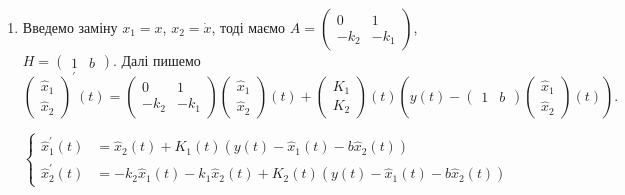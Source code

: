 \begin{solution}
\begin{enumerate}
        \item Введемо заміну $x_1 = x$, $x_2 = \dot x$, тоді маємо $A = \begin{pmatrix} 0 & 1 \\ - k_2 & - k_1 \end{pmatrix}$, $H = \begin{pmatrix} 1 & b \end{pmatrix}$. Далі пишемо
        \[ \begin{pmatrix} \hat x_1 \\ \hat x_2 \end{pmatrix}^\prime (t) = \begin{pmatrix} 0 & 1 \\ - k_2 & - k_1 \end{pmatrix} \begin{pmatrix} \hat x_1 \\ \hat x_2 \end{pmatrix} (t) + \begin{pmatrix} K_1 \\ K_2 \end{pmatrix} (t) \left( y(t) - \begin{pmatrix} 1 & b \end{pmatrix} \begin{pmatrix} \hat x_1 \\ \hat x_2 \end{pmatrix} (t) \right) .\]
        
        \begin{equation*}
            \left\{
                \begin{aligned}
                    \hat x_1^\prime (t) &= \hat x_2 (t) + K_1 (t) (y(t) - \hat x_1(t) - b \hat x_2 (t)) \\
                    \hat x_2^\prime (t) &= - k_2 \hat x_1(t) - k_1 \hat x_2 (t) + K_2 (t) (y(t) - \hat x_1(t) - b \hat x_2 (t))
                \end{aligned}
            \right.
        \end{equation*}
    \end{enumerate}
\end{solution}